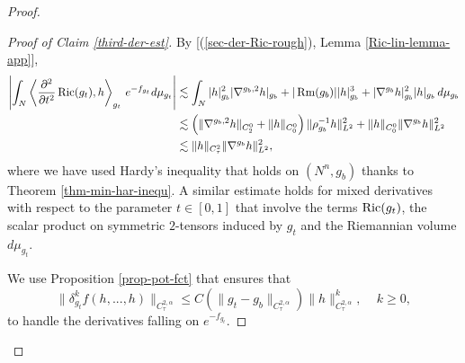 \documentclass[a4paper,11pt,reqno]{amsart}
\def\Ric{\mathop{\rm Ric}\nolimits}
\def\Rm{\mathop{\rm Rm}\nolimits}
\def\Ric{\mathop{\rm Ric}\nolimits}
\def\Rm{\mathop{\rm Rm}\nolimits}
\numberwithin{equation}{section}
\begin{document}
\begin{proof}
\begin{proof}[Proof of Claim \ref{third-der-est}]
			
			By [(\ref{sec-der-Ric-rough}), Lemma \ref{Ric-lin-lemma-app}],  
			\begin{equation}
			\begin{split}
			\left|\int_N\left<\frac{\partial^2}{\partial t^2}\Ric(g_t),h\right>_{g_t}\,e^{-f_{g_t}}d\mu_{g_t}\right|&\lesssim \int_N|h|^2_{g_b}|\nabla^{g_b,2}h|_{g_b}+|\Rm(g_b)||h|_{g_b}^3+|\nabla^{g_b}h|^2_{g_b}|h|_{g_b}\,d\mu_{g_b}\\
			&\lesssim \left(\|\nabla^{g_b,2}h\|_{C^0_{2}}+\|h\|_{C^0_{0}}\right)\|\rho_{g_b}^{-1}h\|_{L^2}^2+\|h\|_{C^0_{0}}\|\nabla^{g_b}h\|_{L^2}^2\\
			&\lesssim \|h\|_{C^2_{\tau}}\|\nabla^{g_b}h\|^2_{L^2},
			\end{split}
			\end{equation}
			where we have used Hardy's inequality that holds on $(N^n,g_b)$ thanks to Theorem \ref{thm-min-har-inequ}. A similar estimate holds for mixed derivatives with respect to the parameter $t\in[0,1]$ that involve the terms $\Ric(g_t)$, the scalar product on symmetric $2$-tensors induced by $g_t$ and the Riemannian volume $d\mu_{g_t}$. 
			
			We use Proposition \ref{prop-pot-fct} that ensures that 
			\begin{equation}\label{control-covid-delta-f}
			\|\delta^k_{g_t}f(h,...,h)\|_{C^{2,\alpha}_{\tau}}\leq C\left(\|g_t-g_b\|_{C^{2,\alpha}_{\tau}}\right)\|h\|^k_{C^{2,\alpha}_{\tau}},\,\quad k\geq 0,
			\end{equation}
			to handle the derivatives falling on $e^{-f_{g_t}}$.
			

\end{proof}
\end{proof}
\end{document}
